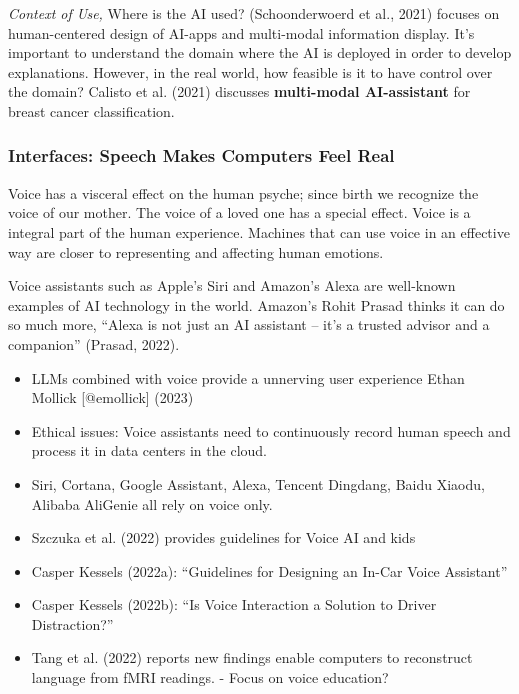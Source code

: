 \documentclass[
  letterpaper,
  DIV=11,
  numbers=noendperiod]{scrartcl}
\providecommand{\tightlist}{%
  \setlength{\itemsep}{0pt}\setlength{\parskip}{0pt}}\usepackage{longtable,booktabs,array}
\begin{document}
\emph{Context of Use,} Where is the AI used? (Schoonderwoerd et al.,
2021) focuses on human-centered design of AI-apps and multi-modal
information display. It's important to understand the domain where the
AI is deployed in order to develop explanations. However, in the real
world, how feasible is it to have control over the domain? Calisto et
al. (2021) discusses \textbf{multi-modal AI-assistant} for breast cancer
classification.

\subsubsection{Interfaces: Speech Makes Computers Feel
Real}\label{interfaces-speech-makes-computers-feel-real}

Voice has a visceral effect on the human psyche; since birth we
recognize the voice of our mother. The voice of a loved one has a
special effect. Voice is a integral part of the human experience.
Machines that can use voice in an effective way are closer to
representing and affecting human emotions.

Voice assistants such as Apple's Siri and Amazon's Alexa are well-known
examples of AI technology in the world. Amazon's Rohit Prasad thinks it
can do so much more, ``Alexa is not just an AI assistant -- it's a
trusted advisor and a companion'' (Prasad, 2022).

\begin{itemize}
\tightlist
\item
  LLMs combined with voice provide a unnerving user experience Ethan
  Mollick {[}@emollick{]} (2023)
\item
  Ethical issues: Voice assistants need to continuously record human
  speech and process it in data centers in the cloud.
\item
  Siri, Cortana, Google Assistant, Alexa, Tencent Dingdang, Baidu
  Xiaodu, Alibaba AliGenie all rely on voice only.
\item
  Szczuka et al. (2022) provides guidelines for Voice AI and kids
\item
  Casper Kessels (2022a): ``Guidelines for Designing an In-Car Voice
  Assistant''
\item
  Casper Kessels (2022b): ``Is Voice Interaction a Solution to Driver
  Distraction?''
\item
  Tang et al. (2022) reports new findings enable computers to
  reconstruct language from fMRI readings. - Focus on voice education?
\end{itemize}
\end{document}

